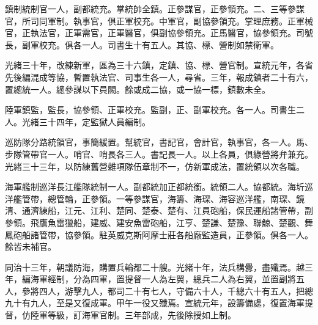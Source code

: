 \begin{pinyinscope}
鎮制統制官一人，副都統充。掌統帥全鎮。正參謀官，正參領充。二、三等參謀官，所司同軍制。執事官，俱正軍校充。中軍官，副協參領充。掌理庶務。正軍械官，正執法官，正軍需官，正軍醫官，俱副協參領充。正馬醫官，協參領充。司號長，副軍校充。俱各一人。司書生十有五人。其協、標、營制如禁衛軍。

光緒三十年，改練新軍，區為三十六鎮，定鎮、協、標、營官制。宣統元年，各省先後編混成等協，暫置執法官、司事生各一人，尋省。三年，報成鎮者二十有六，置總統一人。總參謀以下員闕。餘或成二協，或一協一標，鎮數未全。

陸軍鎮監，監長，協參領、正軍校充。監副，正、副軍校充。各一人。司書生二人。光緒三十四年，定監獄人員編制。

巡防隊分路統領官，事簡緩置。幫統官，書記官，會計官，執事官，各一人。馬、步隊管帶官一人。哨官、哨長各三人。書記長一人。以上各員，俱綠營將弁兼充。光緒三十三年，以防練舊營雜項隊伍章制不一，仿新軍成法，置統領以次各職。

海軍艦制巡洋長江艦隊統制一人。副都統加正都統銜。統領二人。協都統。海圻巡洋艦管帶，總管輪，正參領。一等參謀官，海籌、海琛、海容巡洋艦，南琛、鏡清、通濟練船，江元、江利、楚同、楚泰、楚有、江員砲船，保民運船諸管帶，副參領。飛鷹魚雷獵船，建威、建安魚雷砲船，江亨、楚謙、楚豫、聯鯨、楚觀、舞鳳砲船諸管帶，協參領。駐英威克斯阿摩士莊各船廠監造員，正參領。俱各一人。餘皆未補官。

同治十三年，朝議防海，購置兵輪都二十艘。光緒十年，法兵構釁，盡殲焉。越三年，編海軍經制，分為四軍，置提督一人為左翼，總兵二人為右翼，並置副將五人，參將四人，游擊九人，都司二十有七人，守備六十人，千總六十有五人，把總九十有九人，至是又復成軍。甲午一役又殲焉。宣統元年，設籌備處，復置海軍提督，仿陸軍等級，訂海軍官制。三年部成，先後除授如上制。


\end{pinyinscope}